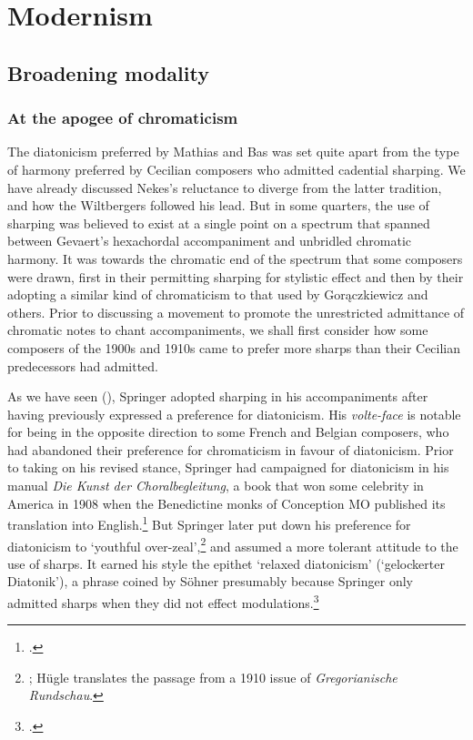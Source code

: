 \chapter{Modernism}
\section{Broadening modality}
\subsection{At the apogee of chromaticism}
\label{hl:springer}\label{sc:springer_chromatic}\label{cc:chromatic}%
The diatonicism preferred by Mathias and Bas was set quite apart from the type of harmony preferred by Cecilian composers who admitted cadential sharping.
We have already discussed Nekes's reluctance to diverge from the latter tradition, and how the Wiltbergers followed his lead.
But in some quarters, the use of sharping was believed to exist at a single point on a spectrum that spanned between Gevaert's hexachordal accompaniment and unbridled chromatic harmony.
It was towards the chromatic end of the spectrum that some composers were drawn, first in their permitting sharping for stylistic effect and then by their adopting a similar kind of chromaticism to that used by Gorączkiewicz and others.
Prior to discussing a movement to promote the unrestricted admittance of chromatic notes to chant accompaniments, we shall first consider how some composers of the 1900s and 1910s came to prefer more sharps than their Cecilian predecessors had admitted.

As we have seen (), Springer adopted sharping in his accompaniments after having previously expressed a preference for diatonicism.
His \emph{volte-face} is notable for being in the opposite direction to some French and Belgian composers, who had abandoned their preference for chromaticism in favour of diatonicism.
Prior to taking on his revised stance, Springer had campaigned for diatonicism in his manual \emph{Die Kunst der Choralbegleitung}, a book that won some celebrity in America in 1908 when the Benedictine monks of Conception MO published its translation into English.\footnote{\covid{}\cite{SpringerKunstChoralbegleitungTheoretischpraktische1907}.}
But Springer later put down his preference for diatonicism to `youthful over-zeal',\footnote{\cite[31]{HugleChromaticsUseAbuse1917}; Hügle translates the passage from a \covid{}1910 issue of \emph{Gregorianische Rundschau}.} and assumed a more tolerant attitude to the use of sharps.
It earned his style the epithet `relaxed diatonicism' (`gelockerter Diatonik'), a phrase coined by Söhner presumably because Springer only admitted sharps when they did not effect modulations.\footcite[52]{SoehnerOrgelbegleitunggregorianischenGesang1936}

